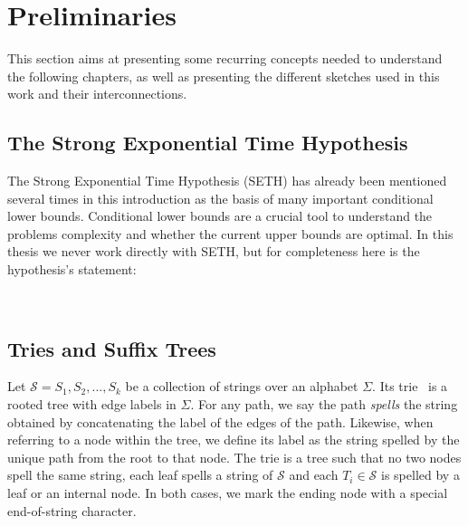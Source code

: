 \section{Preliminaries}\label{sec:prelim}

This section aims at presenting some recurring concepts needed to understand the following chapters, as well as presenting the different sketches used in this work and their interconnections.

\subsection{The Strong Exponential Time Hypothesis}

The Strong Exponential Time Hypothesis (SETH) has already been mentioned several times in this introduction as the basis of many important conditional lower bounds. Conditional lower bounds are a crucial tool to understand the problems complexity and whether the current upper bounds are optimal. In this thesis we never work directly with SETH, but for completeness here is the hypothesis's statement:

\\

\subsection{Tries and Suffix Trees}\label{sec:prelim:tries}
Let $\mathcal{S} = {S_1,S_2, ..., S_k}$ be a collection of strings over an alphabet $\Sigma$. Its trie~\cite{thue1912gegenseitige,de1959file,fredkin1960trie} is a rooted tree with edge labels in $\Sigma$.
For any path, we say the path \emph{spells} the string obtained by concatenating the label of the edges of the path.
Likewise, when referring to a node within the tree, we define its label as the string spelled by the unique path from the root to that node.
The trie is a tree such that no two nodes spell the same string, each leaf spells a string of $\mathcal{S}$ and each $T_i \in \mathcal{S}$ is spelled by a leaf or an internal node. In both cases, we mark the ending node with a special end-of-string character.

